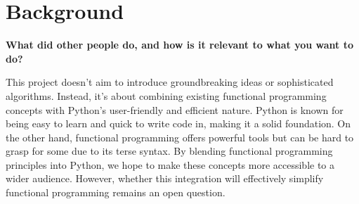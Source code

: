 \documentclass{l4proj}
\begin{document}




    


\chapter{Background}
\textbf{What did other people do, and how is it relevant to what you want to do?}

This project doesn't aim to introduce groundbreaking ideas or sophisticated algorithms. 
Instead, it's about combining existing functional programming concepts with Python's user-friendly and efficient nature.
Python is known for being easy to learn and quick to write code in, making it a solid foundation.
On the other hand, functional programming offers powerful tools but can be hard to grasp for some due to its terse syntax.
By blending functional programming principles into Python, we hope to make these concepts more accessible to a wider audience.
However, whether this integration will effectively simplify functional programming remains an open question.
\end{document}
